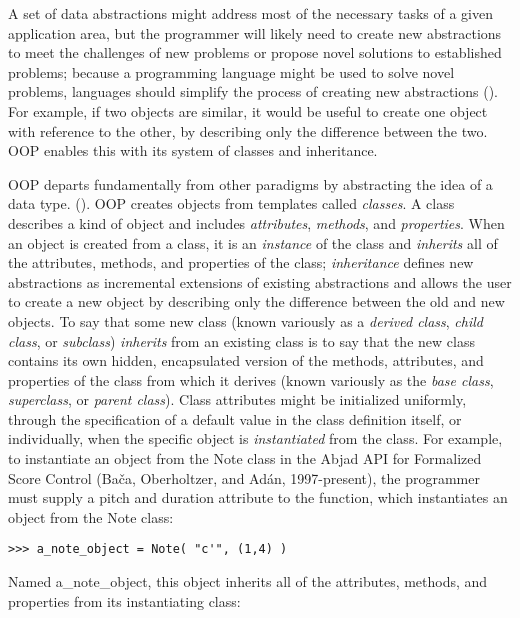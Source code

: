 A set of data abstractions might address most of the necessary tasks of a given application area, but the programmer will likely need to create new abstractions to meet the challenges of new problems or propose novel solutions to established problems; because a programming language might be used to solve novel problems, languages should simplify the process of creating new abstractions (\cite{Liskov:1974rt}). For example, if two objects are similar, it would be useful to create one object with reference to the other, by describing only the difference between the two. OOP enables this with its system of classes and inheritance.

OOP departs fundamentally from other paradigms by abstracting the idea of a data type. (\cite[18]{Van-Roy:2004uq}). OOP creates objects from templates called \emph{classes}. A class describes a kind of object and includes \emph{attributes}, \emph{methods}, and \emph{properties}. When an object is created from a class, it is an \emph{instance} of the class and \emph{inherits} all of the attributes, methods, and properties of the class; \emph{inheritance} defines new abstractions as incremental extensions of existing abstractions and allows the user to create a new object by describing only the difference between the old and new objects. To say that some new class (known variously as a \emph{derived class}, \emph{child class}, or \emph{subclass}) \emph{inherits} from an existing class is to say that the new class contains its own hidden, encapsulated version of the methods, attributes, and properties of the class from which it derives (known variously as the \emph{base class}, \emph{superclass}, or \emph{parent class}). Class attributes might be initialized uniformly, through the specification of a default value in the class definition itself, or individually, when the specific object is \emph{instantiated} from the class. For example, to instantiate an object from the Note class in the Abjad API for Formalized Score Control (Ba\v{c}a, Oberholtzer, and Ad\'{a}n, 1997-present), the programmer must supply a pitch and duration attribute to the function, which instantiates an object from the Note class:

\begin{lstlisting}[basicstyle=\scriptsize\ttfamily, breaklines=True, tabsize=4, showtabs=false, showspaces=false]
>>> a_note_object = Note( "c'", (1,4) )\end{lstlisting}



\noindent Named a\_note\_object, this object inherits all of the attributes, methods, and properties from its instantiating class:

